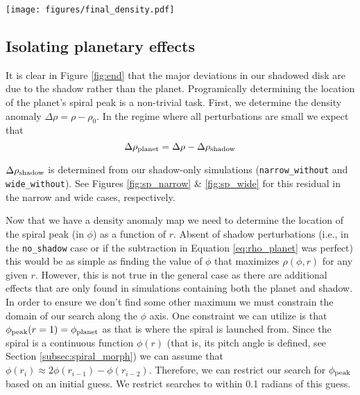 \documentclass[twocolumn]{aastex631}
\begin{document}
\begin{figure*}
    \texttt{[image: figures/final\_density.pdf]}
    \caption{Final gas density anomaly maps for our five simulations. Note the patterns are dominated by
    the rings created by the shadow. The radial axis is scaled logarithmically.
    }
    \label{fig:end}
\end{figure*}

\subsection{Isolating planetary effects}
It is clear in Figure \ref{fig:end} that the major deviations in our shadowed disk are due to the shadow rather than the planet. Programically determining
the location of the planet's spiral peak is a non-trivial task. First, we determine the density anomaly $\Delta \rho = \rho - \rho_0$. In the regime where all perturbations
are small we expect that
\begin{equation}
    \Delta \rho_{\rm planet} = \Delta \rho - \Delta \rho_{\rm shadow}
    \label{eq:rho_planet}
\end{equation}

$\Delta \rho_{\rm shadow}$ is determined from our shadow-only simulations (\texttt{narrow\_without} and \texttt{wide\_without}). See Figures \ref{fig:sp_narrow}
\& \ref{fig:sp_wide} for this residual in the narrow and wide cases, respectively.

Now that we have a density anomaly map we need to determine the location of the spiral peak (in $\phi$) as a function of $r$. Absent of shadow perturbations
(i.e., in the \texttt{no\_shadow} case or if the subtraction in Equation \ref{eq:rho_planet} was perfect) this would be as simple as
finding the value of $\phi$ that maximizes $\rho(\phi,r)$ for any given $r$. However, this is not true in the general case as there are additional
effects that are only found in simulations containing both the planet and shadow. In order to ensure we don't find some other maximum we must constrain
the domain of our search along the $\phi$ axis. One constraint we can utilize is that $\phi_{\rm peak}(r=1) = \phi_{\rm planet}$ as that is where the spiral is
launched from. Since the spiral is a continuous function $\phi(r)$ (that is, its pitch angle is defined, see Section \ref{subsec:spiral_morph}) we can assume that
$\phi(r_i) \approx 2\phi(r_{i-1}) - \phi(r_{i-2})$. Therefore, we can restrict our search for $\phi_{\rm peak}$ based on an initial guess. We restrict searches
to within 0.1 radians of this guess.
\end{document}
